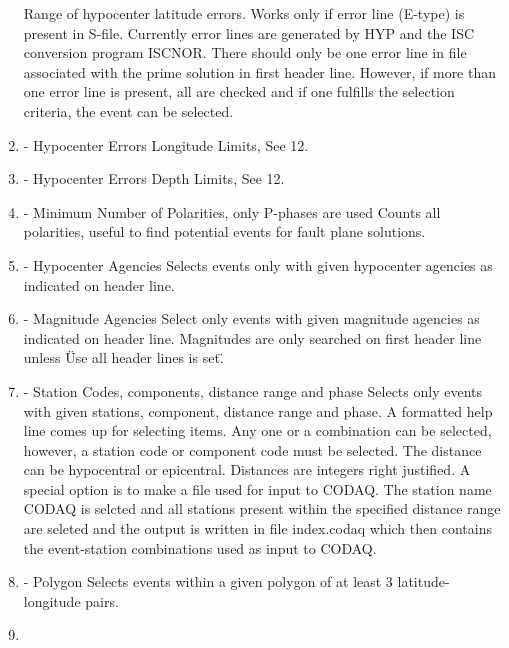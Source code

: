 \begin{enumerate}
Range of hypocenter latitude errors. Works only if error line (E-type) is present in S-file. Currently error lines are generated by HYP and the ISC conversion program ISCNOR. There should only be one error line in file associated with the prime solution in first header line. However, if more than one error line is present, all are checked and if one fulfills the selection criteria, the event can be selected.
\item 
- Hypocenter Errors Longitude Limits, See 12. 
\item 
- Hypocenter Errors Depth Limits, See 12. 
\item 
- Minimum Number of Polarities, only P-phases are used \newline
Counts all polarities, useful to find potential events for fault plane solutions. 
\item 
- Hypocenter Agencies \newline
Selects events only with given hypocenter agencies as indicated on header line. 
\item 
- Magnitude Agencies\newline
{}Select only events with given magnitude agencies as indicated on header line. Magnitudes are only searched on first header line unless \"Use all header lines is set\". 
\item 
- Station Codes, components, distance range and phase\newline
Selects only events with given stations, component, distance range and phase. A formatted help line comes up for selecting items. Any one or a combination can be selected, however, a station code  
or component code 
must be selected. The distance can be hypocentral or epicentral. Distances are integers right justified. A special option is to make a file used for input to CODAQ. The station name CODAQ is selcted and all stations present within the specified distance range are seleted and the output is written in file index.codaq which then contains the event-station combinations used as input to CODAQ. 
\item 
- Polygon \newline
Selects events within a given polygon of at least 3 latitude-longitude pairs.
\item 

\end{enumerate}

